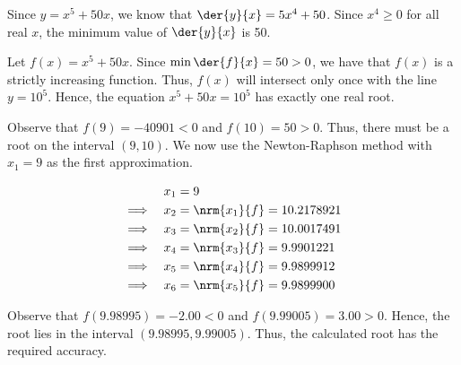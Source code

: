 \documentclass{jhwhw}
\begin{document}
    \solution
        Since $y = x^5 + 50x$, we know that $\der{y}{x} = 5x^4 + 50$. Since $x^4 \geq 0$ for all real $x$, the minimum value of $\der{y}{x}$ is 50.


        Let $f(x) = x^5 + 50x$. Since $\min \der{f}{x} = 50 > 0$, we have that $f(x)$ is a strictly increasing function. Thus, $f(x)$ will intersect only once with the line $y = 10^5$. Hence, the equation $x^5 + 50x = 10^5$ has exactly one real root.

        Observe that $f(9) = -40901 < 0$ and $f(10) = 50 > 0$. Thus, there must be a root on the interval $(9, 10)$. We now use the Newton-Raphson method with $x_1 = 9$ as the first approximation.

        \begin{alignat*}{2}
            && x_1 &= 9 \\
            \implies&&x_2 &= \nrm{x_1}{f} = 10.2178921 \\
            \implies&&x_3 &= \nrm{x_2}{f} = 10.0017491 \\
            \implies&&x_4 &= \nrm{x_3}{f} = 9.9901221 \\
            \implies&&x_5 &= \nrm{x_4}{f} = 9.9899912 \\
            \implies&&x_6 &= \nrm{x_5}{f} = 9.9899900 
        \end{alignat*}


        Observe that $f(9.98995) = -2.00 < 0$ and $f(9.99005) = 3.00 > 0$. Hence, the root lies in the interval $(9.98995, 9.99005)$. Thus, the calculated root has the required accuracy.
\end{document}

